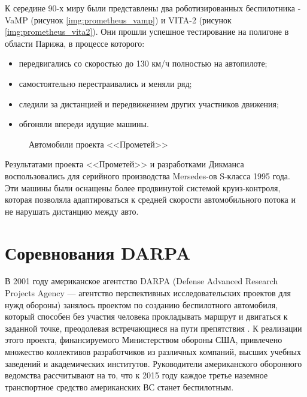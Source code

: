 К середине 90-х миру были представлены два роботизированных беспилотника - 
VaMP (рисунок \ref{img:prometheus_vamp}) и VITA-2
(рисунок \ref{img:prometheus_vita2}). Они прошли успешное тестирование на 
полигоне в области Парижа, в процессе которого:

\begin{itemize}
  \item передвигались со скоростью до 130 км/ч полностью на автопилоте;
  \item самостоятельно перестраивались и меняли ряд;
  \item следили за дистанцией и передвижением других участников движения;
  \item обгоняли впереди идущие машины.
\end{itemize}

\begin{figure}[ht]
  {\centering
      \hfill
      \hfill
      \hfill
  }
  \caption{Автомобили проекта <<Прометей>>}
  \label{img:prometheus}
\end{figure}

Результатами проекта <<Прометей>> и разработками Дикманса воспользовались для 
серийного производства Mersedes-ов S-класса 1995 года. Эти машины были 
оснащены более продвинутой системой круиз-контроля, которая позволяла 
адаптироваться к средней скорости автомобильного потока и не нарушать дистанцию 
между авто.





\section{Соревнования DARPA} \label{sect_DARPA}

В 2001 году американское агентство DARPA (Defense Advanced Research Projects 
Agency — агентство перспективных исследовательских проектов для нужд обороны) 
занялось проектом по созданию беспилотного автомобиля, который способен без 
участия человека прокладывать маршрут и двигаться к заданной точке, 
преодолевая встречающиеся на пути препятствия \cite{DARPAchallnge}.
К реализации этого проекта, 
финансируемого Министерством обороны США, привлечено множество коллективов 
разработчиков из различных компаний, высших учебных заведений и академических 
институтов. Руководители американского оборонного ведомства рассчитывают на 
то, что к 2015 году каждое третье наземное транспортное средство американских 
ВС станет беспилотным.

